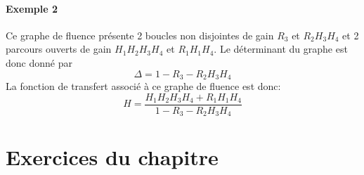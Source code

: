 \paragraph{Exemple 2}

\begin{center}
\end{center}
Ce graphe de fluence présente 2 boucles non disjointes de gain $R_3$ et $R_2H_3H_4$ 
et 2 parcours ouverts de gain $H_1H_2H_3H_4$ et $R_1H_1H_4$.
Le déterminant du graphe est donc donné par 
$$
\Delta=1-R_3-R_2H_3H_4
$$
La fonction de transfert associé à ce graphe de fluence est donc:
$$
H=\dfrac{H_1H_2H_3H_4+R_1H_1H_4}{1-R_3-R_2H_3H_4}
$$

\newpage
\section*{Exercices du chapitre}

\exercice{}
\question



